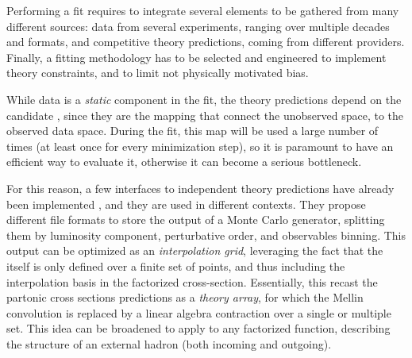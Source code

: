 
Performing a \pdf fit requires to integrate several elements to be gathered
from many different sources: data from several experiments, ranging over
multiple decades and formats, and competitive theory predictions, coming
from different providers.
Finally, a fitting methodology has to be selected and engineered to implement
theory constraints, and to limit not physically motivated bias.

While data is a \textit{static} component in the fit, the theory predictions
depend on the candidate \pdf, since they are the mapping that connect the
unobserved \pdf space, to the observed data space.
During the fit, this map will be used a large number of times (at least once for
every minimization step), so it is paramount to have an efficient way to
evaluate it, otherwise it can become a serious bottleneck.

For this reason, a few interfaces to \pdf independent theory predictions have
already been implemented
\cite{Carli:2010rw,Britzger:2012bs,Britzger:2022lbf,Carrazza:2020gss}, and they
are used in different contexts.
They propose different file formats to store the output of a Monte Carlo
generator, splitting them by luminosity component, perturbative order, and
observables binning.
This output can be optimized as an \textit{interpolation grid}, leveraging the
fact that the \pdf itself is only defined over a finite set of points, and thus
including the interpolation basis in the factorized cross-section.
Essentially, this recast the partonic cross sections predictions as
a \textit{theory array}, for which the Mellin convolution is replaced by a
linear algebra contraction over a single or multiple \pdf set.
This idea can be broadened to apply to any factorized function, describing the
structure of an external hadron (both incoming and outgoing).


